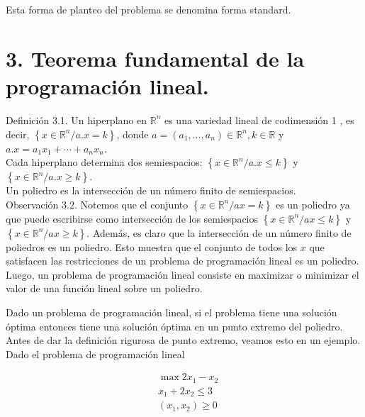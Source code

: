 \documentclass[10pt]{article}
\begin{document}
Esta forma de planteo del problema se denomina forma standard.

\section*{3. Teorema fundamental de la programación lineal.}
Definición 3.1. Un hiperplano en $\mathbb{R}^{n}$ es una variedad lineal de codimensión 1 , es decir, $\left\{x \in \mathbb{R}^{n} / a . x=k\right\}$, donde $a=\left(a_{1}, \ldots, a_{n}\right) \in \mathbb{R}^{n}, k \in \mathbb{R}$ y $a . x=a_{1} x_{1}+\cdots+a_{n} x_{n}$.\\
Cada hiperplano determina dos semiespacios: $\left\{x \in \mathbb{R}^{n} / a . x \leq k\right\}$ y $\left\{x \in \mathbb{R}^{n} / a . x \geq k\right\}$.\\
Un poliedro es la intersección de un número finito de semiespacios.\\
Observación 3.2. Notemos que el conjunto $\left\{x \in \mathbb{R}^{n} / a x=k\right\}$ es un poliedro ya que puede escribirse como intersección de los semiespacios $\left\{x \in \mathbb{R}^{n} / a x \leq k\right\}$ y $\left\{x \in \mathbb{R}^{n} / a x \geq k\right\}$. Además, es claro que la intersección de un número finito de poliedros es un poliedro. Esto muestra que el conjunto de todos los $x$ que satisfacen las restricciones de un problema de programación lineal es un poliedro. Luego, un problema de programación lineal consiste en maximizar o minimizar el valor de una función lineal sobre un poliedro.

Dado un problema de programación lineal, si el problema tiene una solución óptima entonces tiene una solución óptima en un punto extremo del poliedro. Antes de dar la definición rigurosa de punto extremo, veamos esto en un ejemplo.\\
Dado el problema de programación lineal

$$
\begin{aligned}
& \max 2 x_{1}-x_{2} \\
& x_{1}+2 x_{2} \leq 3 \\
& \left(x_{1}, x_{2}\right) \geq 0
\end{aligned}
$$
\end{document}
